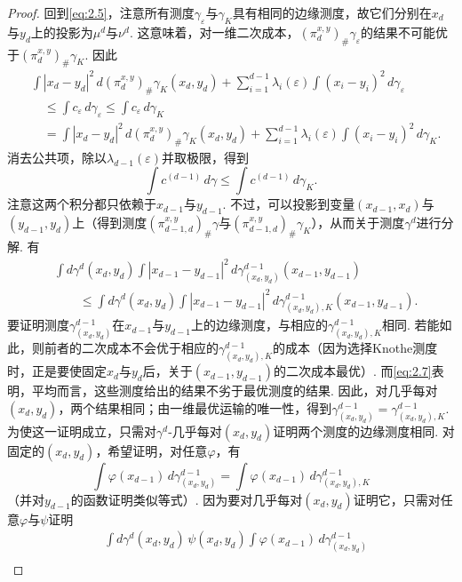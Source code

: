 \begin{proof}
回到\eqref{eq:2.5}，注意所有测度$\gamma_\varepsilon$与$\gamma_K$具有相同的边缘测度，故它们分别在$x_d$与$y_d$上的投影为$\mu^d$与$\nu^d$. 这意味着，对一维二次成本，$(\pi_d^{x,y})_\#\gamma_\varepsilon$的结果不可能优于$(\pi_d^{x,y})_\#\gamma_K$. 因此
\[
\begin{aligned}
&\int|x_d-y_d|^2\,d(\pi_d^{x,y})_\#\gamma_K(x_d,y_d)
 +\sum_{i=1}^{d-1}\lambda_i(\varepsilon)\int(x_i-y_i)^2\,d\gamma_\varepsilon\\
&\quad\le\int c_\varepsilon\,d\gamma_\varepsilon\le\int c_\varepsilon\,d\gamma_K\\
&\quad=\int|x_d-y_d|^2\,d(\pi_d^{x,y})_\#\gamma_K(x_d,y_d)
 +\sum_{i=1}^{d-1}\lambda_i(\varepsilon)\int(x_i-y_i)^2\,d\gamma_K.
\end{aligned}
\]
消去公共项，除以$\lambda_{d-1}(\varepsilon)$并取极限，得到
\begin{equation}\label{eq:2.6}
\int c^{(d-1)}\,d\gamma\le\int c^{(d-1)}\,d\gamma_K.
\end{equation}
注意这两个积分都只依赖于$x_{d-1}$与$y_{d-1}$. 不过，可以投影到变量$(x_{d-1},x_d)$与$(y_{d-1},y_d)$上（得到测度$(\pi_{d-1,d}^{x,y})_\#\gamma$与$(\pi_{d-1,d}^{x,y})_\#\gamma_K$），从而关于测度$\gamma^d$进行分解. 有
\begin{equation}\label{eq:2.7}
\begin{aligned}
&\int d\gamma^d(x_d,y_d)\int|x_{d-1}-y_{d-1}|^2\,d\gamma^{d-1}_{(x_d,y_d)}(x_{d-1},y_{d-1})\\
&\qquad\le\int d\gamma^d(x_d,y_d)\int|x_{d-1}-y_{d-1}|^2\,d\gamma^{d-1}_{(x_d,y_d),K}(x_{d-1},y_{d-1}).
\end{aligned}
\end{equation}
要证明测度$\gamma^{d-1}_{(x_d,y_d)}$在$x_{d-1}$与$y_{d-1}$上的边缘测度，与相应的$\gamma^{d-1}_{(x_d,y_d),K}$相同. 若能如此，则前者的二次成本不会优于相应的$\gamma^{d-1}_{(x_d,y_d),K}$的成本（因为选择Knothe测度时，正是要使固定$x_d$与$y_d$后，关于$(x_{d-1},y_{d-1})$的二次成本最优）. 而\eqref{eq:2.7}表明，平均而言，这些测度给出的结果不劣于最优测度的结果. 因此，对几乎每对$(x_d,y_d)$，两个结果相同；由一维最优运输的唯一性，得到$\gamma^{d-1}_{(x_d,y_d)}=\gamma^{d-1}_{(x_d,y_d),K}$. 为使这一证明成立，只需对$\gamma^d$-几乎每对$(x_d,y_d)$证明两个测度的边缘测度相同. 对固定的$(x_d,y_d)$，希望证明，对任意$\varphi$，有
\[
\int\varphi(x_{d-1})\,d\gamma^{d-1}_{(x_d,y_d)}
=\int\varphi(x_{d-1})\,d\gamma^{d-1}_{(x_d,y_d),K}
\]
（并对$y_{d-1}$的函数证明类似等式）. 因为要对几乎每对$(x_d,y_d)$证明它，只需对任意$\varphi$与$\psi$证明
\[
\begin{aligned}
&\int d\gamma^d(x_d,y_d)\,\psi(x_d,y_d)\int\varphi(x_{d-1})\,d\gamma^{d-1}_{(x_d,y_d)}\\

\end{aligned}\]
\end{proof}
